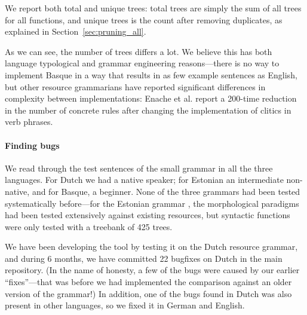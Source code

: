 We report both total and unique trees: total trees are simply the sum
of all trees for all functions, and unique trees is the count after
removing duplicates, as explained in Section~\ref{sec:pruning_all}.

As we can see, the number of trees differs a lot. We believe this has
both language typological and grammar engineering reasons---there
is no way to implement Basque in a way that results in as few example
sentences as English, but other resource grammarians have reported
significant differences in complexity between implementations: Enache
et al. \cite{enache2010} report a 200-time reduction in the number of
concrete rules after changing the implementation of clitics in verb
phrases.



\paragraph{Finding bugs} 
We read through the test sentences of the small grammar in all the
three languages. 
For Dutch we had a native speaker; for Estonian an intermediate non-native,
and for Basque, a beginner. None of the three grammars had been tested
systematically before---for the Estonian grammar
\cite{listenmaa_kaljurand2014}, the morphological paradigms had been
tested extensively against existing resources, but syntactic functions
were only tested with a treebank of 425 trees.

We have been developing the tool by testing it on the Dutch resource
grammar, and during 6 months, we have committed 22 bugfixes on Dutch
in the \gf{} main repository. (In the name of honesty, a few of the bugs were
caused by our earlier ``fixes''---that was before we had implemented
the comparison against an older version of the grammar!) In addition,
one of the bugs found in Dutch was also present in other languages, so
we fixed it in German and English.

